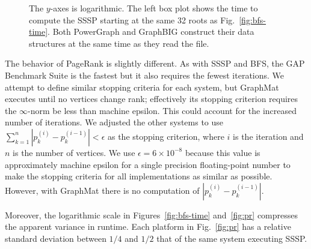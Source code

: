 \documentclass[conference]{IEEEtran}
\begin{document}
\begin{figure}
\begin{minipage}{0.365\linewidth}
	\end{minipage}
	\caption{The $y$-axes is logarithmic. The left box plot shows the time to compute the SSSP starting at the same 32 roots as Fig.~\ref{fig:bfs-time}. Both PowerGraph and GraphBIG construct their data structures at the same time as they read the file.}
	\label{fig:sssp-time}
\end{figure}

The behavior of PageRank is slightly different. As with SSSP and BFS, the GAP Benchmark Suite is the fastest but it also requires the fewest iterations. We attempt to define similar stopping criteria for each system, but GraphMat executes until no vertices change rank; effectively its stopping criterion requires the $\infty$-norm be less than machine epsilon. This could account for the increased number of iterations. We adjusted the other systems to use $\sum_{k=1}^{n} |p_k^{(i)} - p_k^{(i-1)}| < \epsilon $ as the stopping criterion, where $i$ is the iteration and $n$ is the number of vertices. We use $\epsilon = 6 \times 10^{-8}$ because this value is approximately machine epsilon for a single precision floating-point number to make the stopping criteria for all implementations as similar as possible. However, with GraphMat there is no computation of $|p_k^{(i)} - p_k^{(i-1)}|$.

Moreover, the logarithmic scale in Figures~\ref{fig:bfs-time} and~\ref{fig:pr} compresses the apparent variance in runtime. Each platform in Fig.~\ref{fig:pr} has a relative standard deviation between $1/4$ and $1/2$ that of the same system executing SSSP.
\end{document}
